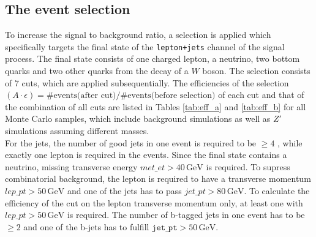 \subsection{The event selection}
To increase the signal to background ratio, a selection is applied which specifically targets the final state of the \texttt{lepton+jets}
channel of the signal process.
The final state consists of one charged lepton, a neutrino, two bottom quarks and two other quarks from the
decay of a $W$ boson. The selection consists of 7 cuts, which are applied subsequentially.
The efficiencies of the selection $(A \cdot \epsilon) = \# \text{events(after cut)} / \# \text{events(before selection)}$ of each cut and that of the combination of all cuts are listed in Tables \ref{tab:eff_a} and \ref{tab:eff_b} for all Monte Carlo samples, which include background simulations as well as $Z\prime$ simulations assuming different masses.\\
For the jets, the number of good jets in one event is required to be $\geq 4$
, while exactly one lepton is required
in the events. Since the final state contains a neutrino, missing transverse energy $met\_et > 40 \, \si{\giga\eV}$
 is required. To supress combinatorial background,
the lepton is required to have a transverse momentum $lep\_pt > 50 \, \si{\giga\eV}$
 and one of
the jets has to pass $jet\_pt > 80 \, \si{\giga\eV}$.
To calculate the efficiency of the cut on the lepton transverse momentum only, at least one with $lep\_pt > 50 \, \si{\giga\eV}$ is required.
The number of b-tagged jets in one event has to be
$\geq 2$
 and one of the b-jets has to fulfill $\texttt{jet\_pt} > 50 \, \si{\giga\eV}$.%
